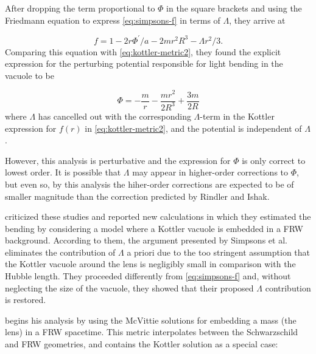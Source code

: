 After dropping the term proportional to $\Phi$ in the square brackets and using the Friedmann equation to express \eqref{eq:simpsons-f} in terms of $\Lambda$, they arrive at

\begin{equation}
  f = 1 - 2r \Phi^{\prime} / a - 2mr^2  R^3 - \Lambda r^2 / 3.
\end{equation}
Comparing this equation with \eqref{eq:kottler-metric2}, they found the explicit expression for the perturbing potential responsible for light bending in the vacuole to be 

\begin{equation}
  \Phi = - \frac{m}{r} - \frac{mr^2}{2R^3} + \frac{3m}{2R}
  \label{eq:simpsons-potential}
\end{equation}
where $\Lambda$ has cancelled out with the corresponding $\Lambda$-term in the Kottler expression for $f(r)$ in \ref{eq:kottler-metric2}, and the potential is independent of $\Lambda$. 

However, this analysis is perturbative and the expression for $\Phi$ is only correct to lowest order. It is possible that $\Lambda$ may appear in higher-order corrections to $\Phi$, but even so, by this analysis the hiher-order corrections are expected to be of smaller magnitude than the correction predicted by Rindler and Ishak. 

\citet{Ishak2008} criticized these studies and reported new calculations in which they estimated the bending by considering a model where a Kottler vacuole is embedded in a FRW background. According to them, the argument presented by Simpsons et al. \citep{Simpson2008} eliminates the contribution of $\Lambda$ a priori due to the too stringent assumption that the Kottler vacuole around the lens is negligibly small in comparison with the Hubble length. They proceeded differently from \eqref{eq:simpsons-f} and, without neglecting the size of the vacuole, they showed that their proposed $\Lambda$ contribution is restored. 

\citet{Park2008} begins his analysis by using the McVittie \citep{1933MNRAS..93..325M} solutions for embedding a mass (the lens) in a FRW spacetime. This metric interpolates between the Schwarzschild and FRW geometries, and contains the Kottler solution as a special case:

